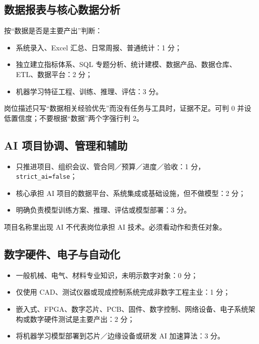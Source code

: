 \documentclass[11pt,a4paper,fontset=none]{ctexart}
\newcommand{\field}[1]{\nolinkurl{#1}}
\begin{document}
\subsection{数据报表与核心数据分析}

按“数据是否是主要产出”判断：

\begin{itemize}
  \item 系统录入、Excel 汇总、日常周报、普通统计：1 分；
  \item 独立建立指标体系、SQL 专题分析、统计建模、数据产品、数据仓库、ETL、数据平台：2 分；
  \item 机器学习特征工程、训练、推理、评估：3 分。
\end{itemize}

岗位描述只写“数据相关经验优先”而没有任务与工具时，证据不足。可判 0 并设低置信度；不要根据“数据”两个字强行判 2。

\subsection{AI 项目协调、管理和辅助}

\begin{itemize}
  \item 只推进项目、组织会议、管合同／预算／进度／验收：1 分，\field{strict_ai=false}；
  \item 核心承担 AI 项目的数据平台、系统集成或基础设施，但不做模型：2 分；
  \item 明确负责模型训练方案、推理、评估或模型部署：3 分。
\end{itemize}

项目名称里出现 AI 不代表岗位承担 AI 技术。必须看动作和责任对象。

\subsection{数字硬件、电子与自动化}

\begin{itemize}
  \item 一般机械、电气、材料专业知识，未明示数字对象：0 分；
  \item 仅使用 CAD、测试仪器或现成控制系统完成非数字工程主业：1 分；
  \item 嵌入式、FPGA、数字芯片、PCB、固件、数字控制、网络设备、电子系统架构或数字硬件测试是主要产出：2 分；
  \item 将机器学习模型部署到芯片／边缘设备或研发 AI 加速算法：3 分。
\end{itemize}
\end{document}
